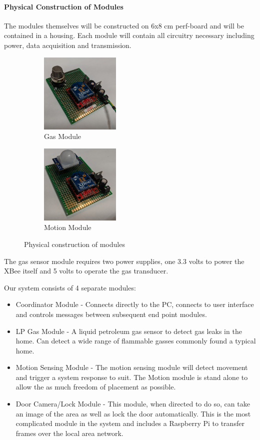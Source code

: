 \documentclass[a4paper,11pt]{report}
\begin{document}
	\paragraph{\normalsize Physical Construction of Modules} The modules themselves will be constructed on 6x8 cm perf-board and will be contained in a housing. Each module will contain all circuitry necessary including power, data acquisition and transmission. 
	\begin{figure}[h!]
		\centering
		\begin{subfigure}[t]{0.45\textwidth}
			\centering
			\includegraphics[height=1.5in]{module_gas.jpg}
			\caption{Gas Module}
		\end{subfigure}
		\begin{subfigure}[t]{0.45\textwidth}
			\centering
			\includegraphics[height=1.5in]{module_motion.jpg}
			\caption{Motion Module}
		\end{subfigure}
		\caption{Physical construction of modules}
	\end{figure}
	\par The gas sensor module requires two power supplies, one 3.3 volts to power the XBee itself and 5 volts to operate the gas transducer. \\
	\par Our system consists of 4 separate modules:
	\begin{itemize}
		\item Coordinator Module - Connects directly to the PC, connects to user interface and controls messages between subsequent end point modules. 
		\item LP Gas Module - A liquid petroleum gas sensor to detect gas leaks in the home. Can detect a wide range of flammable gasses commonly found a typical home.
		\item Motion Sensing Module - The motion sensing module will detect movement and trigger a system response to suit. The Motion module is stand alone to allow the as much freedom of placement as possible.
		\item Door Camera/Lock Module - This module, when directed to do so, can take an image of the area as well as lock the door automatically. This is the most complicated module in the system and includes a Raspberry Pi to transfer frames over the local area network.
	\end{itemize}
\end{document}
